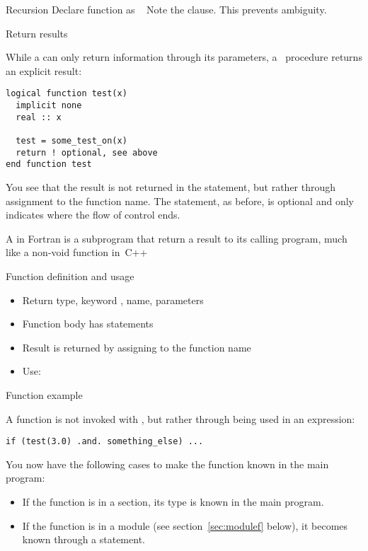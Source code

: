 \begin{block}{Recursion}
  \label{sl:funcf:recursion}
  Declare function as ~
  Note the  clause. This prevents ambiguity.
\end{block}

 {Return results}

While a  can only return information through its parameters,
a~ procedure returns an explicit result:
\begin{verbatim}
logical function test(x)
  implicit none
  real :: x

  test = some_test_on(x)
  return ! optional, see above
end function test
\end{verbatim}
You see that the result is not returned in the  statement,
but rather through assignment to the function name. The 
statement, as before, is optional and only indicates where the flow of
control ends.

A  in Fortran is a subprogram that return a
result to its calling program, much like a non-void function in~C++

\begin{block}{Function definition and usage}
  \label{sl:ffunction-def}
  \begin{itemize}
  \item Return type, keyword , name, parameters
  \item Function body has statements
  \item Result is returned by assigning to the function name
  \item Use: 
  \end{itemize}
\end{block}

\begin{block}{Function example}
  \label{sl:ffunction-ex}
\end{block}

A function is not invoked with , but rather through being used
in an expression:
\begin{verbatim}
if (test(3.0) .and. something_else) ...
\end{verbatim}
You now have the following cases to make the function known in the
main program:
\begin{itemize}
\item If the function is in a  section, its type is known
  in the main program.
\item If the function is in a module (see section~\ref{sec:modulef}
  below), it becomes known through a  statement.
\end{itemize}


